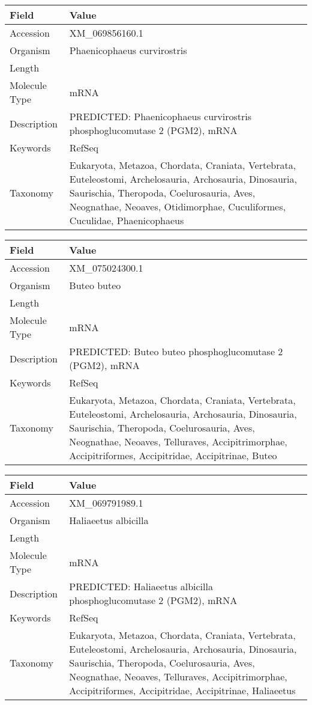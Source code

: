 \documentclass[10pt]{article}
\begin{document}
{\footnotesize
\begin{longtable}{>{\raggedright\arraybackslash}p{4.5cm} >{\raggedright\arraybackslash}p{11.5cm}}
\textbf{Field} & \textbf{Value} \\
\hline
Accession & XM\_069856160.1 \\
Organism & Phaenicophaeus curvirostris \\
Length & 2146 \\
Molecule Type & mRNA \\
Description & PREDICTED: Phaenicophaeus curvirostris phosphoglucomutase 2 (PGM2), mRNA \\
Keywords & RefSeq \\
Taxonomy & Eukaryota, Metazoa, Chordata, Craniata, Vertebrata, Euteleostomi, Archelosauria, Archosauria, Dinosauria, Saurischia, Theropoda, Coelurosauria, Aves, Neognathae, Neoaves, Otidimorphae, Cuculiformes, Cuculidae, Phaenicophaeus \\
\end{longtable}
}

{\footnotesize
\begin{longtable}{>{\raggedright\arraybackslash}p{4.5cm} >{\raggedright\arraybackslash}p{11.5cm}}
\textbf{Field} & \textbf{Value} \\
\hline
Accession & XM\_075024300.1 \\
Organism & Buteo buteo \\
Length & 2705 \\
Molecule Type & mRNA \\
Description & PREDICTED: Buteo buteo phosphoglucomutase 2 (PGM2), mRNA \\
Keywords & RefSeq \\
Taxonomy & Eukaryota, Metazoa, Chordata, Craniata, Vertebrata, Euteleostomi, Archelosauria, Archosauria, Dinosauria, Saurischia, Theropoda, Coelurosauria, Aves, Neognathae, Neoaves, Telluraves, Accipitrimorphae, Accipitriformes, Accipitridae, Accipitrinae, Buteo \\
\end{longtable}
}

{\footnotesize
\begin{longtable}{>{\raggedright\arraybackslash}p{4.5cm} >{\raggedright\arraybackslash}p{11.5cm}}
\textbf{Field} & \textbf{Value} \\
\hline
Accession & XM\_069791989.1 \\
Organism & Haliaeetus albicilla \\
Length & 2203 \\
Molecule Type & mRNA \\
Description & PREDICTED: Haliaeetus albicilla phosphoglucomutase 2 (PGM2), mRNA \\
Keywords & RefSeq \\
Taxonomy & Eukaryota, Metazoa, Chordata, Craniata, Vertebrata, Euteleostomi, Archelosauria, Archosauria, Dinosauria, Saurischia, Theropoda, Coelurosauria, Aves, Neognathae, Neoaves, Telluraves, Accipitrimorphae, Accipitriformes, Accipitridae, Accipitrinae, Haliaeetus \\
\end{longtable}
}
\end{document}
